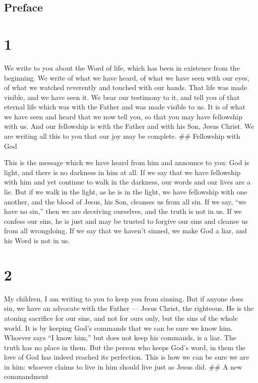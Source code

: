 \hypertarget{preface}{%
\subsection{Preface}\label{preface}}

\hypertarget{section}{%
\section{1}\label{section}}

 We write to you about the Word of life, which has been in
existence from the beginning. We write of what we have heard, of what we
have seen with our eyes, of what we watched reverently and touched with
our hands.  That life was made visible, and we have seen it.
We bear our testimony to it, and tell you of that eternal life which was
with the Father and was made visible to us.  It is of what
we have seen and heard that we now tell you, so that you may have
fellowship with us. And our fellowship is with the Father and with his
Son, Jesus Christ.  We are writing all this to you that our
joy may be complete. \#\# Fellowship with God

 This is the message which we have heard from him and
announce to you: God is light, and there is no darkness in him at all.
 If we say that we have fellowship with him and yet continue
to walk in the darkness, our words and our lives are a lie. 
But if we walk in the light, as he is in the light, we have fellowship
with one another, and the blood of Jesus, his Son, cleanses us from all
sin.  If we say, ``we have no sin,'' then we are deceiving
ourselves, and the truth is not in us.  If we confess our
sins, he is just and may be trusted to forgive our sins and cleanse us
from all wrongdoing.  If we say that we haven't sinned, we
make God a liar, and his Word is not in us.

\hypertarget{section-1}{%
\section{2}\label{section-1}}

 My children, I am writing to you to keep you from sinning.
But if anyone does sin, we have an advocate with the Father --- Jesus
Christ, the righteous.  He is the atoning sacrifice for our
sins, and not for ours only, but the sins of the whole world.
 It is by keeping God's commands that we can be sure we know
him.  Whoever says ``I know him,'' but does not keep his
commands, is a liar. The truth has no place in them.  But
the person who keeps God's word, in them the love of God has indeed
reached its perfection. This is how we can be sure we are in him:
 whoever claims to live in him should live just as Jesus
did. \#\# A new commandment

